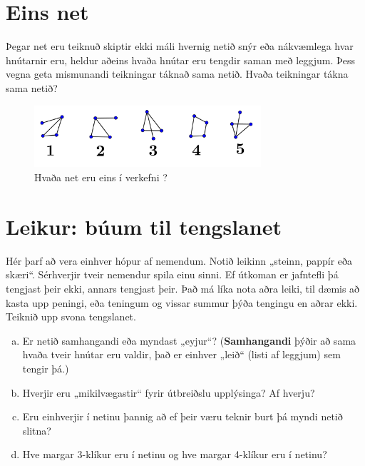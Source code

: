 \documentclass[b5paper,12pt]{book}
\renewcommand*\thesection{\arabic{section}}
\begin{document}
\section{Eins net}
Þegar net eru teiknuð skiptir ekki máli hvernig netið snýr eða nákvæmlega hvar hnútarnir eru, heldur aðeins hvaða hnútar eru tengdir saman með leggjum. Þess vegna geta mismunandi teikningar táknað sama netið. Hvaða teikningar tákna sama netið?
\begin{figure}[h]
  \includegraphics[width=0.75\textwidth, center]{einsnet.png}
  \caption*{Hvaða net eru eins í verkefni \thesection{}?}
\end{figure}

\section{Leikur: búum til tengslanet}
Hér þarf að vera einhver hópur af nemendum. Notið leikinn „steinn, pappír eða skæri“. Sérhverjir tveir nemendur spila einu sinni. Ef útkoman er jafntefli þá tengjast þeir ekki, annars tengjast þeir. Það má líka nota aðra leiki, til dæmis að kasta upp peningi, eða teningum og vissar summur þýða tengingu en aðrar ekki. Teiknið upp svona tengslanet.  
\begin{enumerate}[(a)]
    \item Er netið samhangandi eða myndast „eyjur“? (\textbf{Samhangandi} þýðir að sama hvaða tveir hnútar eru valdir, það er einhver „leið“ (listi af leggjum) sem tengir þá.)  
    \item Hverjir eru „mikilvægastir“ fyrir útbreiðslu upplýsinga? Af hverju?
    \item Eru einhverjir í netinu þannig að ef þeir væru teknir burt þá myndi netið slitna?
    \item Hve margar 3-klíkur eru í netinu og hve margar 4-klíkur eru í netinu?
\end{enumerate}
\end{document}
